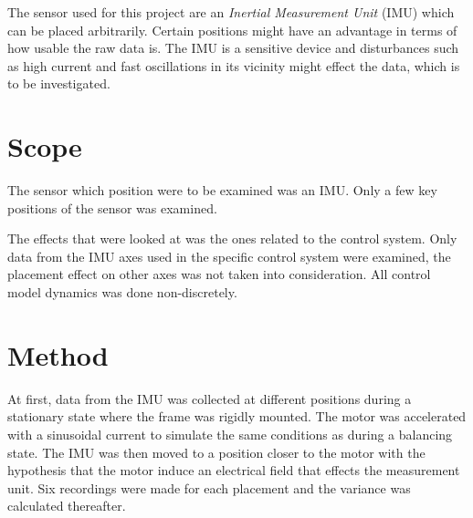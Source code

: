 \documentclass[a4paper,11pt]{kth-mag}
\begin{document}
The sensor used for this project are an \textit{Inertial Measurement Unit} (IMU) which can be placed arbitrarily. Certain positions might have an advantage in terms of how usable the raw data is. The IMU is a sensitive device and disturbances such as high current and fast oscillations in its vicinity might effect the data, which is to be investigated. 

\section{Scope}
The sensor which position were to be examined was an IMU. Only a few key positions of the sensor was examined.

The effects that were looked at was the ones related to the control system. Only data from the IMU axes used in the specific control system were examined, the placement effect on other axes was not taken into consideration. All control model dynamics was done non-discretely.

\section{Method} \label{sec: method}
At first, data from the IMU was collected at different positions during a stationary state where the frame was rigidly mounted. The motor was accelerated with a sinusoidal current to simulate the same conditions as during a balancing state. The IMU was then moved to a position closer to the motor with the hypothesis that the motor induce an electrical field that effects the measurement unit.
Six recordings were made for each placement and the variance was calculated thereafter.
\end{document}
